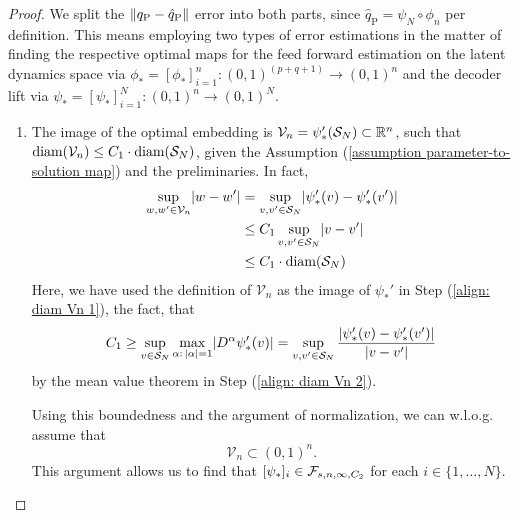 \begin{proof}
    We split the $\lVert q_\text{P} - \hat q_\text{P} \rVert$ error 
    into both parts, since $\hat{q}_\text{P} = \psi_N \circ \phi_n$ per definition.
    This means employing two types of error estimations
    in the matter of finding the respective optimal maps for the 
    feed forward estimation on the latent dynamics space via $\phi_* = [\phi_*]_{i=1}^n: (0, 1)^{(p+q+1)} \to (0, 1)^n$ 
    and the decoder lift via $\psi_* = [\psi_*]_{i=1}^N:(0, 1)^n \to (0, 1)^N$. 
    \begin{enumerate}
        \item[-] The image of the optimal
        embedding is $\mathcal{V}_n = \psi_*'(\mathcal{S}_N) \subset \mathbb{R}^n$, such that $\text{diam}(\mathcal{V}_n) 
        \leq C_1 \cdot \text{diam}(\mathcal{S}_N)$, given 
        the Assumption (\ref{assumption parameter-to-solution map}) and the preliminaries.
        In fact,
        \begin{align}
            \sup\limits_{w, w' \in \mathcal{V}_n} \lvert w - w' \rvert &= 
            \sup\limits_{v, v' \in \mathcal{S}_N} \lvert \psi_*'(v) - \psi_*'(v') \rvert \label{align: diam Vn 1} \\
            &\leq C_1 \sup\limits_{v, v' \in \mathcal{S}_N} \lvert v - v' \rvert \label{align: diam Vn 2} \\
            &\leq C_1 \cdot \text{diam}(\mathcal{S}_N)
        \end{align}
        Here, we have used the definition of $\mathcal{V}_n$ as the image of $\psi_*'$ in Step (\ref{align: diam Vn 1}),
        the fact, that 
        \begin{equation*}
            C_1 \geq \sup\limits_{v \in \mathcal{S}_N} 
            \max\limits_{\alpha : \, \lvert \alpha \rvert = 1} \lvert D^\alpha \psi_*'(v) \rvert = \sup\limits_{v, v' \in \mathcal{S}_N} 
            \frac{\lvert \psi_*'(v) - \psi_*'(v') \rvert}{\lvert v - v' \rvert}
        \end{equation*}
        by the mean value theorem \cite[p. 107]{rudin1976} in Step (\ref{align: diam Vn 2}). 
        
        Using this boundedness and
        the argument of normalization, we can w.l.o.g.
        assume that 
        \begin{equation*}
            \mathcal{V}_n \subset (0, 1)^n.
        \end{equation*}
        This argument allows us to find that $[\psi_*]_i \in \mathcal{F}_{s, n, \infty, C_2}$ for each 
        $i \in \{1, \dots, N\}$. 
        

\end{enumerate}
\end{proof}
